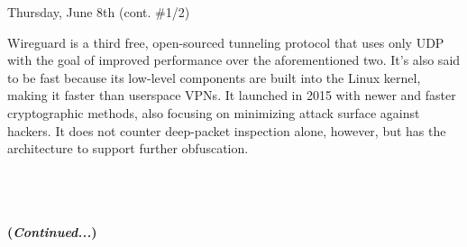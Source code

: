\documentclass[11pt]{article}
\begin{document}
\begin{orangebox}{Thursday, June 8th \hspace{0.2cm}(cont. \#1/2)\vspace{-2.2em}\begin{flushright}\end{flushright}}
\begin{itemize}
        \phantom{~~~~} Wireguard is a third free, open-sourced tunneling protocol that uses only UDP with the goal of improved performance over the aforementioned two. It's also said to be fast because its low-level components are built into the Linux kernel, making it faster than userspace VPNs. It launched in 2015 with newer and faster cryptographic methods, also focusing on minimizing attack surface against hackers. It does not counter deep-packet inspection alone, however, but has the architecture to support further obfuscation.
    \end{itemize}
    \begin{center}
        \vspace{-0.5em}
        \large\bullet \\
        \large\bullet \\
        \large\bullet \\
        \Large\textbf{(\textit{Continued...})}
    \end{center}
\end{orangebox}
\end{document}
